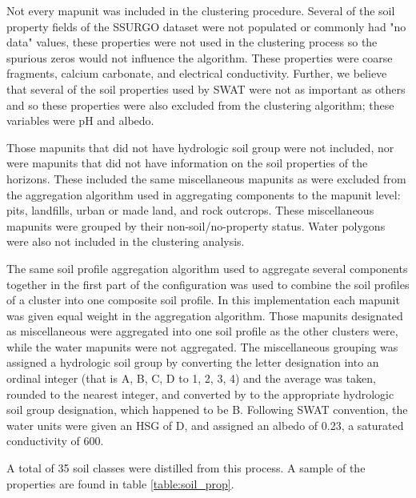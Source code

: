 {Not every mapunit was included in the clustering procedure. Several of the soil property fields of the SSURGO dataset were not populated or commonly had "no data" values, these properties were not used in the
clustering process so the spurious zeros would not influence the algorithm.
These properties were coarse fragments, calcium carbonate, and electrical
conductivity.  Further, we believe that several of the soil properties used by
SWAT were not as important as others and so these properties were also excluded
from the clustering algorithm; these variables were pH and albedo.

 Those mapunits that
did not have hydrologic soil group were not included, nor were mapunits that did
not have information on the soil properties of the horizons. These included the
same miscellaneous mapunits as were excluded from the aggregation algorithm used
in aggregating components to the mapunit level: pits, landfills, urban or made
land, and rock outcrops. These miscellaneous mapunits were grouped by their
non-soil/no-property status. Water polygons were also not included in the
clustering analysis.

The same soil profile aggregation algorithm \citep{beaudette_algorithms_2013}
used to aggregate several components together in the first part of the
configuration was used to combine the soil profiles of a cluster into one
composite soil profile. In this implementation each mapunit was given equal
weight in the aggregation algorithm. Those mapunits designated as miscellaneous
were aggregated into one soil profile as the other clusters were, while the
water mapunits were not aggregated. The miscellaneous  grouping was assigned a
hydrologic soil group by converting the letter designation into an ordinal
integer (that is A, B, C, D to 1, 2, 3, 4) and the average was taken, rounded to
the nearest integer, and converted by to the appropriate hydrologic soil group
designation, which happened to be B. Following SWAT convention, the water units
were given an HSG of D, and assigned an albedo of 0.23, a saturated conductivity
of 600.

A total of 35 soil classes were distilled from this process. A sample of the
properties are found in table \ref{table:soil_prop}.


}
